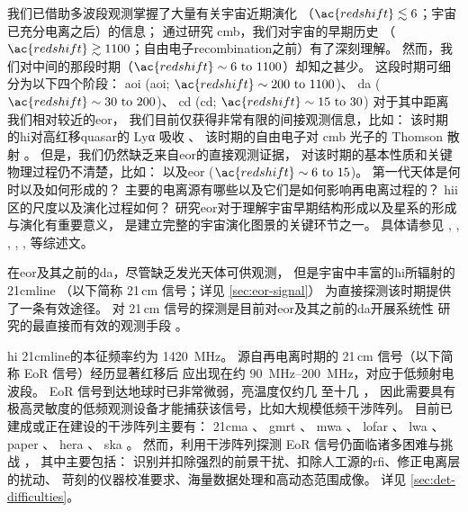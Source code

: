 我们已借助多波段观测掌握了大量有关宇宙近期演化
（$\ac{redshift} \lesssim 6$；宇宙已充分电离之后）的信息；
通过研究 \ac{cmb}，我们对宇宙的早期历史
（$\ac{redshift} \gtrsim 1100$；自由电子\ac{recombination}之前）有了深刻理解。
然而，我们对中间的那段时期（$\ac{redshift} \sim \numrange{6}{1100}$）却知之甚少。
这段时期可细分为以下四个阶段\cite{koopmans2015}：
\acs{aoi} (\acl{aoi}; $\ac{redshift} \sim \numrange{200}{1100}$)、
\acs{da} ($\ac{redshift} \sim \numrange{30}{200}$)、
\acs{cd} (\acl{cd}; $\ac{redshift} \sim \numrange{15}{30}$)
对于其中距离我们相对较近的\acl{eor}，
我们目前仅获得非常有限的间接观测信息，比如：
该时期的\ac{hi}对高红移\ac{quasar}的 Lyα 吸收 \cite{becker2001}、
该时期的自由电子对 \ac{cmb} 光子的 Thomson 散射 \cite{kaplinghat2003}。
但是，我们仍然缺乏来自\acl{eor}的直接观测证据，
对该时期的基本性质和关键物理过程仍不清楚，比如：
以及\acl{eor} ($\ac{redshift} \sim \numrange{6}{15}$)。
第一代天体是何时以及如何形成的？
主要的电离源有哪些以及它们是如何影响再电离过程的？
\ac{hii}区的尺度以及演化过程如何？
研究\acl{eor}对于理解宇宙早期结构形成以及星系的形成与演化有重要意义，
是建立完整的宇宙演化图景的关键环节之一。
具体请参见 , ,
, ,
,  等综述文。

在\acl{eor}及其之前的\ac{da}，尽管缺乏发光天体可供观测，
但是宇宙中丰富的\ac{hi}所辐射的 \ac{21cmline}
（以下简称 21\,cm 信号；详见 \autoref{sec:eor-signal}）
为直接探测该时期提供了一条有效途径。
对 21\,cm 信号的探测是目前对\acl{eor}及其之前的\ac{da}开展系统性
研究的最直接而有效的观测手段
\cite{madau1997,tozzi2000,furlanetto2006,koopmans2015,furlanetto2016}。

\ac{hi} \ac{21cmline}的本征频率约为 \SI{1420}{\MHz}。
源自再电离时期的 21\,cm 信号（以下简称 EoR 信号）经历显著红移后
应出现在约 \SIrange{90}{200}{\MHz}，对应于低频射电波段。
EoR 信号到达地球时已非常微弱，亮温度仅约几 \si{\mK} 至十几 \si{\mK}，
因此需要具有极高灵敏度的低频观测设备才能捕获该信号，比如大规模低频干涉阵列。
目前已建成或正在建设的干涉阵列主要有：
\ac{21cma} \cite{zheng2016}、
\ac{gmrt} \cite{paciga2011}、
\ac{mwa} \cite{bowman2013,tingay2013}、
\ac{lofar} \cite{vanHaarlem2013}、
\ac{lwa} \cite{ellingson2009}、
\ac{paper} \cite{parsons2010}、
\ac{hera} \cite{deBoer2017}、
\ac{ska} \cite{mellema2013,koopmans2015}。
然而，利用干涉阵列探测 EoR 信号仍面临诸多困难与挑战
\cite{morales2010,wijnholds2010}，
其中主要包括：
识别并扣除强烈的前景干扰、扣除人工源的\ac{rfi}、修正电离层的扰动、
苛刻的仪器校准要求、海量数据处理和高动态范围成像。
详见 \autoref{sec:det-difficulties}。

